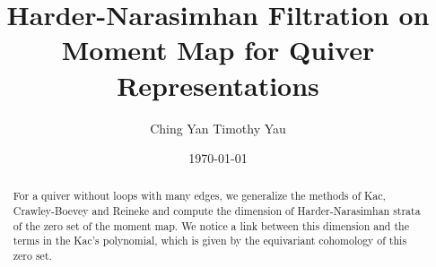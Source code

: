 \documentclass[12pt]{amsart}
\theoremstyle{plain}
\theoremstyle{definition}
\theoremstyle{remark}
\begin{document}
\title{Harder-Narasimhan Filtration on Moment Map for Quiver Representations}
\author{Ching Yan Timothy Yau}
\date{\today}

\maketitle

\begin{abstract}
For a quiver without loops with many edges, we generalize the methods of Kac, Crawley-Boevey and Reineke and compute the dimension of Harder-Narasimhan strata of the zero set of the moment map. We notice a link between this dimension and the terms in the Kac's polynomial, which is given by the equivariant cohomology of this zero set.
\end{abstract}

\end{document}
